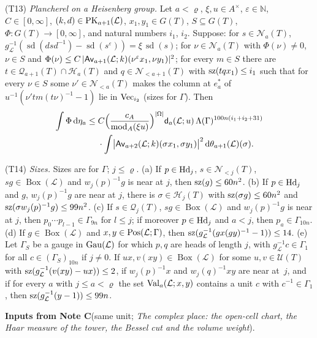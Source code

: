 \documentclass[11pt,a4paper]{article}
\newcommand{\m}[1]{\mbox{$#1$}}        %
\newcommand{\subhead}[1]{\par\addvspace{9pt plus 2pt}\Needspace{4\baselineskip}\noindent\textbf{#1}\enspace\ignorespaces}
\theoremstyle{plainx}
\theoremstyle{uprightx}
\newcommand{\cL}{\mathcal{L}}
\newcommand{\NN}{\mathbb{N}}
\newcommand{\dd}{\mathrm{d}}
\newcommand{\GT}[1]{G(#1)}
\newcommand{\Hl}[2]{\mathcal{H}_{#1}(#2)}
\newcommand{\Ql}[2]{\mathcal{Q}_{#1}(#2)}
\newcommand{\Nb}[2]{\mathcal{N}_{<#1}(#2)}
\newcommand{\Nf}[2]{\mathcal{N}_{#1}(#2)}
\newcommand{\UT}[1]{\mathcal{U}(#1)}
\newcommand{\modA}{\operatorname{mod}_A}
\newcommand{\sd}{\operatorname{sd}}
\newcommand{\wl}[2]{w_{#1}(#2)}
\newcommand{\gL}[1]{g_{#1}}
\newcommand{\BoxL}[1]{\operatorname{Box}(#1)}
\newcommand{\Inp}[1]{\textup{(#1)}}
\begin{document}
\Inp{T13} \emph{Plancherel on a Heisenberg group.} Let $a<\varrho$, $\xi,u\in A^{\times}$, $\varepsilon\in\NN$,
$C\in[0,\infty]$, \m{\IsPairingKernel{\cL}{a+1}{k}{d}}, $x_1,y_1\in\GT{T}$, $S\subseteq\GT{T}$,
$\Phi\colon\GT{T}\to[0,\infty]$, and natural numbers $i_1$, $i_2$. Suppose: for $s\in\Nf{a}{T}$,
$\gL{\cL}^{-1}(\sd(dsd^{-1})-\sd(s^{\varepsilon}))=\xi\,\sd(s)$; for $\nu\in\Nf{a}{T}$ with $\Phi(\nu)\ne0$,
$\nu\in S$ and $\Phi(\nu)\le C\,|\upperPairing{\cL}{a+1}{k}{\nu^{\varepsilon}x_1}{\nu y_1}|^{2}$; for every $m\in S$
there are $t\in\Ql{a+1}{T}\cap\Hl{a}{T}$ and $q\in\Nb{a+1}{T}$ with \m{\HasMatSize{i_1}{tqx_1}} such that for
every $\nu\in S$ some $\nu'\in\Nb{a}{T}$ makes the column at $e^*_a$ of $u^{-1}(\nu'tm(t\nu)^{-1}-1)$ lie in
$\mathrm{Vec}_{i_2}$ (sizes for $\Gamma$). Then
\[\begin{aligned}\int\Phi\,\dd\eta_a\le{}& C\Bigl(\frac{c_A}{\modA(\xi u)}\Bigr)^{|\Omega|}\floorModulus{\cL}{a}{u}\,\Lambda(\Gamma)^{100n(i_1+i_2+31)}\\
&\cdot\int\bigl|\upperPairing{\cL}{a+2}{k}{\sigma x_1}{\sigma y_1}\bigr|^{2}\,\dd\floorMeasure{\cL}{a+1}(\sigma).\end{aligned}\]

\Inp{T14} \emph{Sizes.} Sizes are for $\Gamma$; $j\le\varrho$. (a) If \m{\IsHead{j}{p}}, $s\in\Nb{j}{T}$,
$sg\in\BoxL{\cL}$ and $\wl{j}{p}^{-1}g$ is near at $j$, then \m{\HasMatSize{60n^2}{g}}. (b) If \m{\IsHead{j}{p}}
and $g$, $\wl{j}{p}^{-1}g$ are near at $j$, there is $\sigma\in\Hl{j}{T}$ with \m{\HasMatSize{60n^2}{\sigma g}} and
\m{\HasMatSize{99n^2}{\sigma\wl{j}{p}^{-1}g}}. (c) If $s\in\Ql{j}{T}$, $sg\in\BoxL{\cL}$ and $\wl{j}{p}^{-1}g$ is
near at $j$, then $p_0\cdots p_{l-1}\in\Gamma_{9n}$ for $l\le j$; if moreover \m{\IsHead{j}{p}} and $a<j$, then
$p_a\in\Gamma_{10n}$. (d) If $g\in\BoxL{\cL}$ and $x,y\in\positionsOfSize{\cL}{\Gamma}$, then
\m{\HasMatSize{14}{\gL{\cL}^{-1}(gx(gy)^{-1}-1)}}. (e) Let $\Gamma_S$ be a gauge in $\Gauges{\cL}$ for which $p,q$
are heads of length $j$, with $\gL{\cL}^{-1}c\in\Gamma_1$ for all $c\in(\Gamma_S)_{10n}$ if $j\ne0$. If
$ux,v(xy)\in\BoxL{\cL}$ for some $u,v\in\UT{T}$ with \m{\HasMatSize{2}{\gL{\cL}^{-1}(v(xy)-ux)}}, if
$\wl{j}{p}^{-1}x$ and $\wl{j}{q}^{-1}xy$ are near at~$j$, and if for every $a$ with $j\le a<\varrho$ the set
$\floorValues{\cL}{a}{x}{y}$ contains a unit $c$ with $c^{-1}\in\Gamma_1$, then
\m{\HasMatSize{99n}{\gL{\cL}^{-1}(y-1)}}.

\subhead{Inputs from Note C}\label{s:inpC}(same unit; \emph{The complex place: the
open-cell chart, the Haar measure of the tower, the Bessel cut and the volume weight}).
\end{document}
